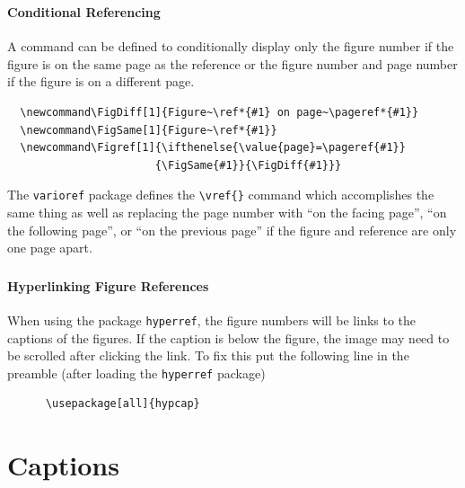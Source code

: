 \documentclass[article]{beamer}
\begin{document}
\begin{frame}[fragile]
  \frametitle{\thesubsection}
  \framesubtitle{Conditional Referencing}
  A command can be defined to conditionally display only the figure number if
  the figure is on the same page as the reference or the figure number and
  page number if the figure is on a different page.
  \footnotesize
  \begin{verbatim}
  \newcommand\FigDiff[1]{Figure~\ref*{#1} on page~\pageref*{#1}}
  \newcommand\FigSame[1]{Figure~\ref*{#1}}
  \newcommand\Figref[1]{\ifthenelse{\value{page}=\pageref{#1}}
                       {\FigSame{#1}}{\FigDiff{#1}}}
  \end{verbatim}
  \vspace{-12pt}\normalsize
  The \texttt{varioref} package defines the \texttt{\textbackslash vref\{\}}
  command which accomplishes the same thing as well as replacing the page
  number with ``on the facing page'', ``on the following page'', or ``on the
  previous page'' if the figure and reference are only one page apart.
\end{frame}

\begin{frame}[fragile]
  \frametitle{\thesubsection}
  \framesubtitle{Hyperlinking Figure References}
    When using the package \texttt{hyperref}, the figure numbers will
      be links to the captions of the figures.  If the caption is below the
      figure, the image may need to be scrolled after clicking the link.  To
      fix this put the following line in the preamble (after loading the
      \texttt{hyperref} package)
      \begin{verbatim}
      \usepackage[all]{hypcap}
      \end{verbatim}
\end{frame}


\section{Captions}
\end{document}
